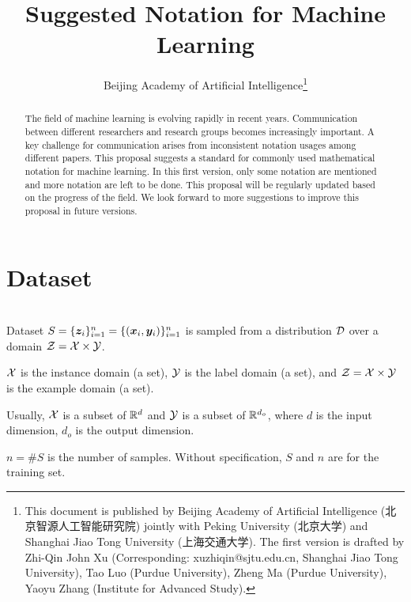 \documentclass{article}
\begin{document}
\title{Suggested Notation for Machine Learning}
\author{Beijing Academy of Artificial Intelligence\thanks{This document is published by Beijing Academy of Artificial Intelligence  (北京智源人工智能研究院)  jointly with Peking University (北京大学) and Shanghai Jiao Tong University (上海交通大学). The first version is drafted by Zhi-Qin John Xu (Corresponding: xuzhiqin@sjtu.edu.cn, Shanghai Jiao Tong University), Tao Luo (Purdue University), Zheng Ma (Purdue University), Yaoyu Zhang (Institute for Advanced Study).}}


\maketitle
\begin{abstract}
    The field of machine learning is evolving rapidly in recent years. Communication between different researchers and research groups becomes increasingly important. A key challenge for communication arises from inconsistent notation usages among different papers. This proposal suggests a standard for commonly used mathematical notation for machine learning. In this first version, only some notation are mentioned and more notation are left to be done. This proposal will be regularly updated based on the progress of the field. We look forward to more suggestions to improve this proposal in future versions.
\end{abstract}

\tableofcontents

\section{Dataset}~\\
Dataset  $S=\{\bm{z}_i\}_{i=1}^n=\{(\bm{x}_i,\bm{y}_i)\}_{i=1}^n$ is sampled from a distribution $\mathcal{D}$ over a domain $\mathcal{Z}=\mathcal{X}\times\mathcal{Y}$.

$\mathcal{X}$  is the instance domain (a set), $\mathcal{Y}$ is the label domain (a set), and $\mathcal{Z}=\mathcal{X}\times\mathcal{Y}$ is the example domain (a set).

Usually,
$\mathcal{X}$ is a subset of $\mathbb{R}^d$ and $\mathcal{Y}$ is a subset of $\mathbb{R}^{d_{o}}$, where $d$ is the input dimension, $d_{o}$ is the output dimension.

$n=\#S$ is the number of samples. Without specification, $S$ and $n$ are for the training set.
\end{document}
